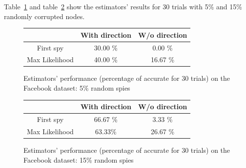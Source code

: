Table~\ref{table:fb:05} and table~\ref{table:fb:15} show the estimators' results for 30 trials with 5\% and 15\% randomly corrupted nodes. 

\begin{figure}
\label{table:fb:05}
\begin{tabular}{c | c | c}
  & With direction & W/o direction \\
  \hline
  First spy & 30.00 \% & 0.00 \% \\ 
  Max Likelihood & 40.00 \% & 16.67 \% \\
\end{tabular}
\caption{Estimators' performance (percentage of accurate for 30 trials) on the Facebook dataset: 5\% random spies}
\end{figure}


\begin{figure}
\label{table:fb:15}
\begin{tabular}{c | c | c}
  & With direction & W/o direction \\
  \hline
  First spy & 66.67 \% & 3.33 \% \\ 
  Max Likelihood & 63.33\% & 26.67 \% \\
\end{tabular}
\caption{Estimators' performance (percentage of accurate for 30 trials) on the Facebook dataset: 15\% random spies}
\end{figure}

